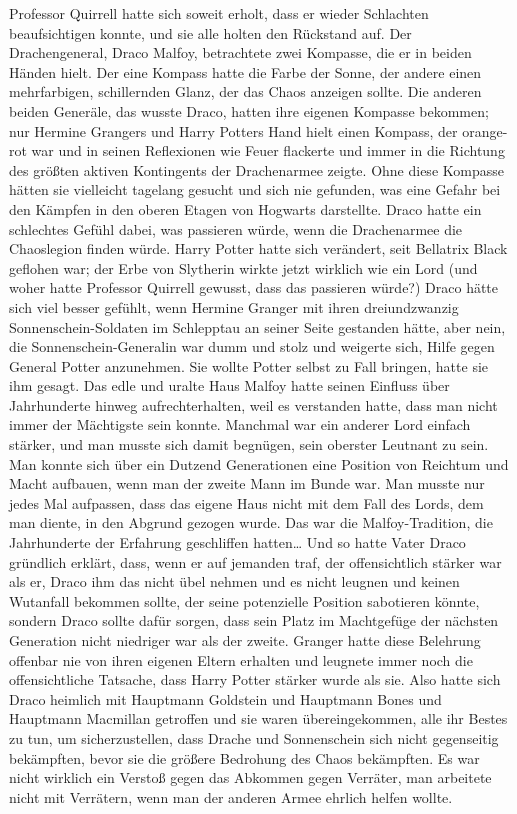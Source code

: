 {Professor Quirrell hatte sich soweit erholt, dass er wieder Schlachten beaufsichtigen konnte, und sie alle holten den Rückstand auf. Der Drachengeneral, Draco Malfoy, betrachtete zwei Kompasse, die er in beiden Händen hielt. Der eine Kompass hatte die Farbe der Sonne, der andere einen mehrfarbigen, schillernden Glanz, der das Chaos anzeigen sollte. Die anderen beiden Generäle, das wusste Draco, hatten ihre eigenen Kompasse bekommen; nur Hermine Grangers und Harry Potters Hand hielt einen Kompass, der orange-rot war und in seinen Reflexionen wie Feuer flackerte und immer in die Richtung des größten aktiven Kontingents der Drachenarmee zeigte. Ohne diese Kompasse hätten sie vielleicht tagelang gesucht und sich nie gefunden, was eine Gefahr bei den Kämpfen in den oberen Etagen von Hogwarts darstellte. Draco hatte ein schlechtes Gefühl dabei, was passieren würde, wenn die Drachenarmee die Chaoslegion finden würde. Harry Potter hatte sich verändert, seit Bellatrix Black geflohen war; der Erbe von Slytherin wirkte jetzt wirklich wie ein Lord (und woher hatte Professor Quirrell gewusst, dass das passieren würde?) Draco hätte sich viel besser gefühlt, wenn Hermine Granger mit ihren dreiundzwanzig Sonnenschein-Soldaten im Schlepptau an seiner Seite gestanden hätte, aber nein, die Sonnenschein-Generalin war dumm und stolz und weigerte sich, Hilfe gegen General Potter anzunehmen. Sie wollte Potter selbst zu Fall bringen, hatte sie ihm gesagt. Das edle und uralte Haus Malfoy hatte seinen Einfluss über Jahrhunderte hinweg aufrechterhalten, weil es verstanden hatte, dass man nicht immer der Mächtigste sein konnte. Manchmal war ein anderer Lord einfach stärker, und man musste sich damit begnügen, sein oberster Leutnant zu sein. Man konnte sich über ein Dutzend Generationen eine Position von Reichtum und Macht aufbauen, wenn man der zweite Mann im Bunde war. Man musste nur jedes Mal aufpassen, dass das eigene Haus nicht mit dem Fall des Lords, dem man diente, in den Abgrund gezogen wurde. Das war die Malfoy-Tradition, die Jahrhunderte der Erfahrung geschliffen hatten… Und so hatte Vater Draco gründlich erklärt, dass, wenn er auf jemanden traf, der offensichtlich stärker war als er, Draco ihm das nicht übel nehmen und es nicht leugnen und keinen Wutanfall bekommen sollte, der seine potenzielle Position sabotieren könnte, sondern Draco sollte dafür sorgen, dass sein Platz im Machtgefüge der nächsten Generation nicht niedriger war als der zweite. Granger hatte diese Belehrung offenbar nie von ihren eigenen Eltern erhalten und leugnete immer noch die offensichtliche Tatsache, dass Harry Potter stärker wurde als sie. Also hatte sich Draco heimlich mit Hauptmann Goldstein und Hauptmann Bones und Hauptmann Macmillan getroffen und sie waren übereingekommen, alle ihr Bestes zu tun, um sicherzustellen, dass Drache und Sonnenschein sich nicht gegenseitig bekämpften, bevor sie die größere Bedrohung des Chaos bekämpften. Es war nicht wirklich ein Verstoß gegen das Abkommen gegen Verräter, man arbeitete nicht mit Verrätern, wenn man der anderen Armee ehrlich helfen wollte.

}
